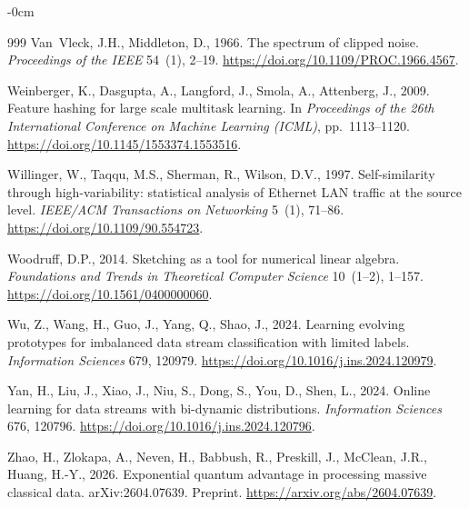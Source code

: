 \documentclass[sensors,article,submit,pdftex,moreauthors]{Definitions/mdpi}
\begin{document}
\begin{adjustwidth}{-\extralength}{0cm}
\begin{thebibliography}{999}
Van~Vleck, J.H., Middleton, D., 1966.
\newblock The spectrum of clipped noise.
\newblock \emph{Proceedings of the IEEE} 54~(1), 2--19.
\newblock \url{https://doi.org/10.1109/PROC.1966.4567}.

Weinberger, K., Dasgupta, A., Langford, J., Smola, A., Attenberg, J., 2009.
\newblock Feature hashing for large scale multitask learning.
\newblock In \emph{Proceedings of the 26th International Conference on Machine Learning (ICML)}, pp.~1113--1120.
\newblock \url{https://doi.org/10.1145/1553374.1553516}.

Willinger, W., Taqqu, M.S., Sherman, R., Wilson, D.V., 1997.
\newblock Self-similarity through high-variability: statistical analysis of Ethernet LAN traffic at the source level.
\newblock \emph{IEEE/ACM Transactions on Networking} 5~(1), 71--86.
\newblock \url{https://doi.org/10.1109/90.554723}.

Woodruff, D.P., 2014.
\newblock Sketching as a tool for numerical linear algebra.
\newblock \emph{Foundations and Trends in Theoretical Computer Science} 10~(1--2), 1--157.
\newblock \url{https://doi.org/10.1561/0400000060}.

Wu, Z., Wang, H., Guo, J., Yang, Q., Shao, J., 2024.
\newblock Learning evolving prototypes for imbalanced data stream classification with limited labels.
\newblock \emph{Information Sciences} 679, 120979.
\newblock \url{https://doi.org/10.1016/j.ins.2024.120979}.

Yan, H., Liu, J., Xiao, J., Niu, S., Dong, S., You, D., Shen, L., 2024.
\newblock Online learning for data streams with bi-dynamic distributions.
\newblock \emph{Information Sciences} 676, 120796.
\newblock \url{https://doi.org/10.1016/j.ins.2024.120796}.

Zhao, H., Zlokapa, A., Neven, H., Babbush, R., Preskill, J., McClean, J.R., Huang, H.-Y., 2026.
\newblock Exponential quantum advantage in processing massive classical data.
\newblock arXiv:2604.07639. Preprint.
\newblock \url{https://arxiv.org/abs/2604.07639}.

\end{thebibliography}
\end{adjustwidth}
\end{document}
